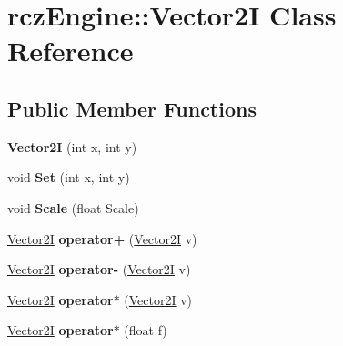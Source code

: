 \hypertarget{classrcz_engine_1_1_vector2_i}{}\section{rcz\+Engine\+:\+:Vector2\+I Class Reference}
\label{classrcz_engine_1_1_vector2_i}
\subsection*{Public Member Functions}
\begin{DoxyCompactItemize}
\item 
\hypertarget{classrcz_engine_1_1_vector2_i_a537955d0b111410eddbde76741bbe3b2}{}{\bfseries Vector2\+I} (int x, int y)\label{classrcz_engine_1_1_vector2_i_a537955d0b111410eddbde76741bbe3b2}

\item 
\hypertarget{classrcz_engine_1_1_vector2_i_a67627ea05937c3213860e8c2c9ed1d9c}{}void {\bfseries Set} (int x, int y)\label{classrcz_engine_1_1_vector2_i_a67627ea05937c3213860e8c2c9ed1d9c}

\item 
\hypertarget{classrcz_engine_1_1_vector2_i_a52a93d274b00591941e1f4b6552f174b}{}void {\bfseries Scale} (float Scale)\label{classrcz_engine_1_1_vector2_i_a52a93d274b00591941e1f4b6552f174b}

\item 
\hypertarget{classrcz_engine_1_1_vector2_i_aadd7faae9fe4b32aa170a3690560d552}{}\hyperlink{classrcz_engine_1_1_vector2_i}{Vector2\+I} {\bfseries operator+} (\hyperlink{classrcz_engine_1_1_vector2_i}{Vector2\+I} v)\label{classrcz_engine_1_1_vector2_i_aadd7faae9fe4b32aa170a3690560d552}

\item 
\hypertarget{classrcz_engine_1_1_vector2_i_a5f337019d003b0d58607f351b6325a03}{}\hyperlink{classrcz_engine_1_1_vector2_i}{Vector2\+I} {\bfseries operator-\/} (\hyperlink{classrcz_engine_1_1_vector2_i}{Vector2\+I} v)\label{classrcz_engine_1_1_vector2_i_a5f337019d003b0d58607f351b6325a03}

\item 
\hypertarget{classrcz_engine_1_1_vector2_i_a8cac6a643299148e63b3b168d76eb937}{}\hyperlink{classrcz_engine_1_1_vector2_i}{Vector2\+I} {\bfseries operator$\ast$} (\hyperlink{classrcz_engine_1_1_vector2_i}{Vector2\+I} v)\label{classrcz_engine_1_1_vector2_i_a8cac6a643299148e63b3b168d76eb937}

\item 
\hypertarget{classrcz_engine_1_1_vector2_i_a4ca689fa06cb9de8ade42d4951ad15ed}{}\hyperlink{classrcz_engine_1_1_vector2_i}{Vector2\+I} {\bfseries operator$\ast$} (float f)\label{classrcz_engine_1_1_vector2_i_a4ca689fa06cb9de8ade42d4951ad15ed}


\end{DoxyCompactItemize}
